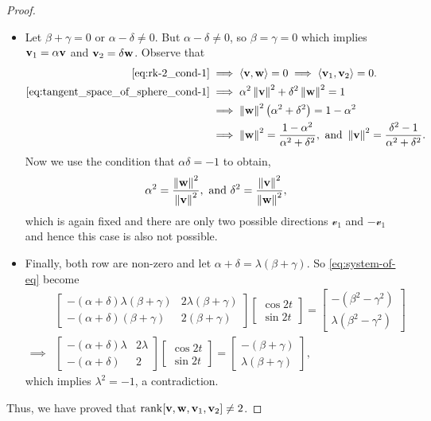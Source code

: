 \begin{proof}
\begin{itemize}
	\item Let $\beta+\gamma=0$ or $\alpha-\delta\neq 0$. But $\alpha-\delta\neq 0$, so $\beta=\gamma=0$ which implies $\mathbf{v}_1=\alpha \mathbf{v}$ and $\mathbf{v}_2=\delta\mathbf{w}$. Observe that 
	\begin{align*}
		\eqref{eq:rk-2_cond-1} & \implies \left\langle \mathbf{v},\mathbf{w} \right\rangle=0 \implies \left\langle \mathbf{v}_1,\mathbf{v}_2 \right\rangle=0. \\
		\eqref{eq:tangent_space_of_sphere_cond-1} & \implies \alpha^2 \left\|\mathbf{v}\right\|^2 + \delta^2 \left\|\mathbf{w}\right\|^2 = 1 \\ 
		& \implies \left\|\mathbf{w}\right\|^2 \left(\alpha^2+\delta^2\right)=1-\alpha^2\\ 
		& \implies \left\|\mathbf{w}\right\|^2 = \frac{1-\alpha^2}{\alpha^2+\delta^2}, \text{ and } \left\|\mathbf{v}\right\|^2 =  \frac{\delta^2-1}{\alpha^2+\delta^2}. 
	\end{align*}
	Now we use the condition that $\alpha \delta=-1$ to obtain, 
	\begin{displaymath}
		 \alpha^2=\frac{\left\|\mathbf{w}\right\|^2}{\left\|\mathbf{v}\right\|^2}, \text{ and } \delta^2 = \frac{\left\|\mathbf{v}\right\|^2}{\left\|\mathbf{w}\right\|^2}, 
	\end{displaymath}
	which is again fixed and there are only two possible directions $\mathcal{v}_1$ and $-\mathcal{v}_1$ and hence this case is also not possible. 

	\item Finally, both row are non-zero and let $\alpha+\delta=\lambda(\beta+\gamma)$. So \eqref{eq:system-of-eq} become 
	\begin{align*}
		& \begin{bmatrix}
			-(\alpha+\delta)\lambda(\beta+\gamma) & 2\lambda(\beta+\gamma) \\ 
			-(\alpha+\delta)(\beta+\gamma) & 2(\beta+\gamma) 
		\end{bmatrix}
		\begin{bmatrix}
			\cos 2t \\ \sin 2t
		\end{bmatrix}
		= \begin{bmatrix}
			-\left(\beta^2-\gamma^2\right) \\ \lambda \left(\beta^2-\gamma^2\right)
		\end{bmatrix} 
		\\
		\implies & 
		\begin{bmatrix}
			-(\alpha+\delta)\lambda & 2\lambda \\ 
			-(\alpha+\delta) & 2
		\end{bmatrix} 
		\begin{bmatrix}
			\cos 2t \\ \sin 2t
		\end{bmatrix} 
		= \begin{bmatrix}
			-(\beta+\gamma) \\ \lambda (\beta+\gamma)
		\end{bmatrix},
	\end{align*}
	which implies $\lambda^2=-1$, a contradiction. 
	\end{itemize} 
	Thus, we have proved that $\operatorname{rank}[\mathbf{v},\mathbf{w},\mathbf{v}_1,\mathbf{v}_2]\neq 2$.
	

\end{proof}
